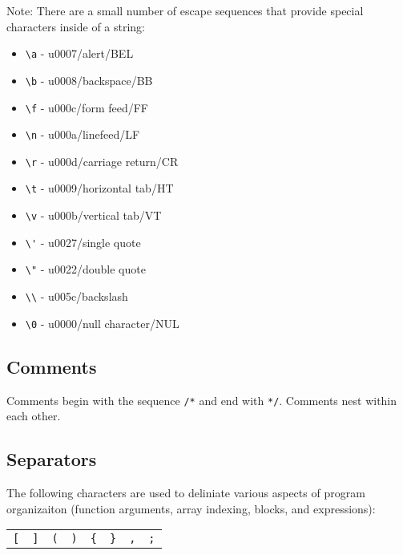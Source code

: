 Note: There are a small number of escape sequences that provide special characters inside of a string:
\begin{itemize}
\item \verb!\a! - u0007/alert/BEL
\item \verb!\b! - u0008/backspace/BB
\item \verb!\f! - u000c/form feed/FF
\item \verb!\n! - u000a/linefeed/LF
\item \verb!\r! - u000d/carriage return/CR
\item \verb!\t! - u0009/horizontal tab/HT
\item \verb!\v! - u000b/vertical tab/VT
\item \verb!\'! - u0027/single quote
\item \verb!\"! - u0022/double quote
\item \verb!\\! - u005c/backslash
\item \verb!\0! - u0000/null character/NUL 
\end{itemize}

\subsection{Comments}
Comments begin with the sequence \verb!/*! and end with \verb!*/!. Comments nest within each other.

\subsection{Separators}
The following characters are used to deliniate various aspects of program organizaiton (function arguments, array indexing, blocks, and expressions):
\begin{center}
\begin{tabular}{cccccccc}
\verb![! & \verb|]| & \verb!(! & \verb!)! & \verb!{! & \verb!}! & \verb!,! & \verb!;!\\
\end{tabular}
\end{center}

